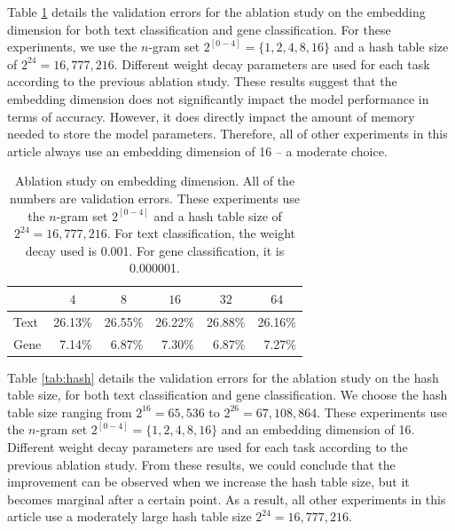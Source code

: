 \documentclass[sigconf,review, anonymous]{acmart}
\begin{document}
Table \ref{tab:embed} details the validation errors for the ablation study on the embedding dimension for both text classification and gene classification. For these experiments, we use the \(n\)-gram set \(2^{[0-4]}=\{1,2,4,8,16\}\) and a hash table size of \(2^{24} = 16,777,216\). Different weight decay parameters are used for each task according to the previous ablation study. These results suggest that the embedding dimension does not significantly impact the model performance in terms of accuracy. However, it does directly impact the amount of memory needed to store the model parameters. Therefore, all of other experiments in this article always use an embedding dimension of 16 -- a moderate choice.

\begin{table}[h]
  \caption{Ablation study on embedding dimension. All of the numbers are validation errors. These experiments use the \(n\)-gram set \(2^{[0-4]}\) and a hash table size of \(2^{24} = 16,777,216\). For text classification, the weight decay used is 0.001. For gene classification, it is 0.000001.}
  \label{tab:embed}
  \begin{center}
    \begin{tabular}{lrrrrr}
      \hline
      &
      \multicolumn{1}{c}{\(4\)} &
      \multicolumn{1}{c}{\(8\)} &
      \multicolumn{1}{c}{\(16\)} &
      \multicolumn{1}{c}{\(32\)} & \multicolumn{1}{c}{\(64\)} \\ \hline
      Text & 26.13\% & 26.55\% & 26.22\% & 26.88\% & 26.16\% \\
      Gene & 7.14\% & 6.87\% & 7.30\% & 6.87\% & 7.27\% \\
    \hline
    \end{tabular}
  \end{center}
\end{table}

Table \ref{tab:hash} details the validation errors for the ablation study on the hash table size, for both text classification and gene classification. We choose the hash table size ranging from \(2^{16}=65,536\) to \(2^{26}=67,108,864\). These experiments use the \(n\)-gram set \(2^{[0-4]}=\{1,2,4,8,16\}\) and an embedding dimension of 16. Different weight decay parameters are used for each task according to the previous ablation study. From these results, we could conclude that the improvement can be observed when we increase the hash table size, but it becomes marginal after a certain point. As a result, all other experiments in this article use a moderately large hash table size \(2^{24}=16,777,216\).
\end{document}
